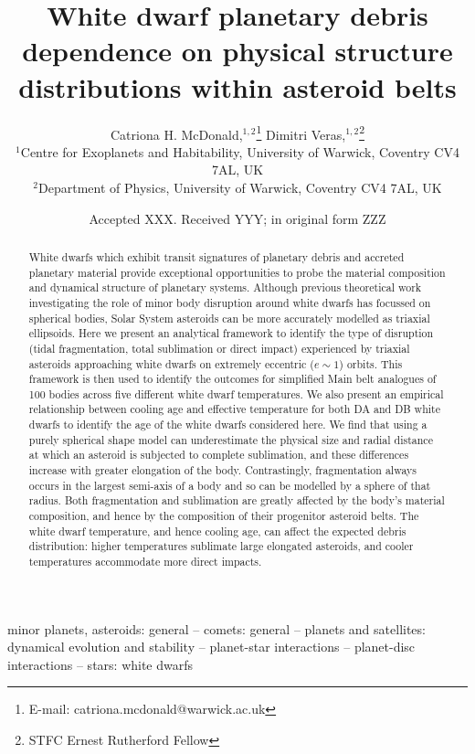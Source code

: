 \documentclass[fleqn,usenatbib]{mnras}
\title[White dwarf planetary debris from asteroid belts]{White dwarf planetary debris dependence on physical structure distributions within asteroid belts}
\author[McDonald \& Veras]{
Catriona H. McDonald,$^{1, 2}$\thanks{E-mail: catriona.mcdonald@warwick.ac.uk}
Dimitri Veras,$^{1, 2}$\thanks{STFC Ernest Rutherford Fellow}
\\
$^{1}$Centre for Exoplanets and Habitability, University of Warwick, Coventry CV4 7AL, UK\\
$^{2}$Department of Physics, University of Warwick, Coventry CV4 7AL, UK \\
}
\date{Accepted XXX. Received YYY; in original form ZZZ}
\begin{document}
\label{firstpage}
\pagerange{\pageref{firstpage}--\pageref{lastpage}}
\maketitle

\begin{abstract}
White dwarfs which exhibit transit signatures of planetary debris and accreted planetary material provide exceptional opportunities to probe the material composition and dynamical structure of planetary systems. 
Although previous theoretical work investigating the role of minor body disruption around white dwarfs has focussed on spherical bodies, Solar System asteroids can be more accurately modelled as triaxial ellipsoids. 
Here we present an analytical framework to identify the type of disruption (tidal fragmentation, total sublimation or direct impact) experienced by triaxial asteroids approaching white dwarfs on extremely eccentric ($e \sim 1$) orbits. 
This framework is then used to identify the outcomes for simplified Main belt analogues of 100 bodies across five different white dwarf temperatures. 
We also present an empirical relationship between cooling age and effective temperature for both DA and DB white dwarfs to identify the age of the white dwarfs considered here.
We find that using a purely spherical shape model can underestimate the physical size and radial distance at which an asteroid is subjected to complete sublimation, and these differences increase with greater elongation of the body.
Contrastingly, fragmentation always occurs in the largest semi-axis of a body and so can be modelled by a sphere of that radius. 
Both fragmentation and sublimation are greatly affected by the body's material composition, and hence by the composition of their progenitor asteroid belts.
The white dwarf temperature, and hence cooling age, can affect the expected debris distribution: higher temperatures sublimate large elongated asteroids, and cooler temperatures accommodate more direct impacts. 
\end{abstract}

\begin{keywords}
minor planets, asteroids: general 
-- 
comets: general 
-- 
planets and satellites: dynamical evolution and stability
--
planet-star interactions
--
planet-disc interactions
--
stars: white dwarfs
\end{keywords}
\end{document}
